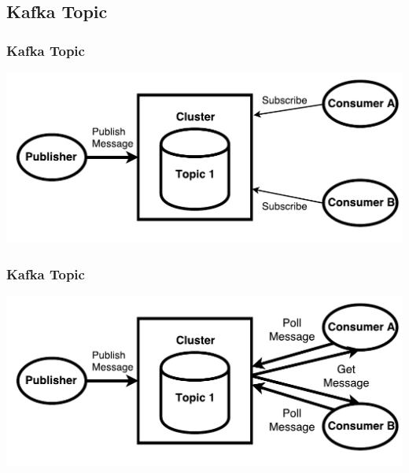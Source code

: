 \subsection{Kafka Topic}
\begin{frame}
\frametitle{Kafka Topic}
\centering
\includegraphics[scale=0.6]{figure/Kafka_topic_draw_subscribe.pdf}
\end{frame}

\begin{frame}
\frametitle{Kafka Topic}
\centering
\includegraphics[scale=0.6]{figure/Kafka_topic_draw_Poll.pdf}
\end{frame}

